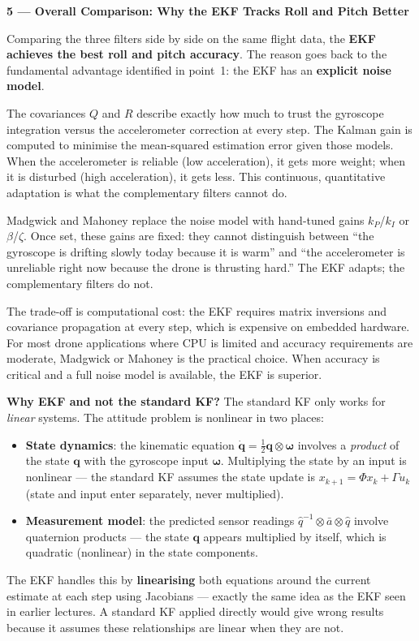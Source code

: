 \documentclass[12pt, a4paper]{article}
\begin{document}
\begin{keybox}
  \textbf{5 --- Overall Comparison: Why the EKF Tracks Roll and Pitch Better}

  Comparing the three filters side by side on the same flight data, the
  \textbf{EKF achieves the best roll and pitch accuracy}.
  The reason goes back to the fundamental advantage identified in point~1:
  the EKF has an \textbf{explicit noise model}.

  The covariances $Q$ and $R$ describe exactly how much to trust the
  gyroscope integration versus the accelerometer correction at every step.
  The Kalman gain is computed to minimise the mean-squared estimation
  error given those models.
  When the accelerometer is reliable (low acceleration), it gets more
  weight; when it is disturbed (high acceleration), it gets less.
  This continuous, quantitative adaptation is what the complementary
  filters cannot do.

  Madgwick and Mahoney replace the noise model with hand-tuned gains
  $k_P$/$k_I$ or $\beta$/$\zeta$.
  Once set, these gains are fixed: they cannot distinguish between
  ``the gyroscope is drifting slowly today because it is warm'' and
  ``the accelerometer is unreliable right now because the drone is
  thrusting hard.''
  The EKF adapts; the complementary filters do not.

  The trade-off is computational cost: the EKF requires matrix inversions
  and covariance propagation at every step, which is expensive on embedded
  hardware.
  For most drone applications where CPU is limited and accuracy requirements
  are moderate, Madgwick or Mahoney is the practical choice.
  When accuracy is critical and a full noise model is available, the EKF
  is superior.

  \textbf{Why EKF and not the standard KF?}
  The standard KF only works for \emph{linear} systems.
  The attitude problem is nonlinear in two places:
  \begin{itemize}[leftmargin=1.2em, itemsep=2pt]
    \item \textbf{State dynamics}: the kinematic equation
      $\dot{\mathbf{q}} = \tfrac{1}{2}\mathbf{q}\otimes\boldsymbol{\omega}$
      involves a \emph{product} of the state $\mathbf{q}$ with the
      gyroscope input $\boldsymbol{\omega}$.
      Multiplying the state by an input is nonlinear --- the standard KF
      assumes the state update is $x_{k+1} = \Phi x_k + \Gamma u_k$
      (state and input enter separately, never multiplied).
    \item \textbf{Measurement model}: the predicted sensor readings
      $\hat{q}^{-1}\otimes\bar{a}\otimes\hat{q}$ involve quaternion
      products --- the state $\mathbf{q}$ appears multiplied by itself,
      which is quadratic (nonlinear) in the state components.
  \end{itemize}
  The EKF handles this by \textbf{linearising} both equations around the
  current estimate at each step using Jacobians --- exactly the same
  idea as the EKF seen in earlier lectures.
  A standard KF applied directly would give wrong results because it
  assumes these relationships are linear when they are not.
\end{keybox}
\end{document}
